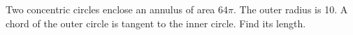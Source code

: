 Two concentric circles enclose an annulus of area $64\pi$. The outer radius is 10. A chord of the outer circle is tangent to the inner circle. Find its length.
